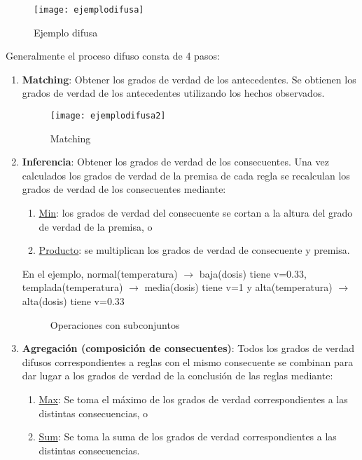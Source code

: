 \documentclass[12pt]{article}
\begin{document}
\begin{figure}[H]
\centering
\texttt{[image: ejemplodifusa]}
\caption{Ejemplo difusa}
\label{fig:ejemplodifusa}
\end{figure}

Generalmente el proceso difuso consta de 4 pasos:
\begin{enumerate}
\item \textbf{Matching}: Obtener los grados de verdad de los antecedentes. Se obtienen los grados de verdad de los antecedentes utilizando los hechos observados.
\begin{figure}[H]
\centering
\texttt{[image: ejemplodifusa2]}
\caption{Matching}
\label{fig:ejemplodifusa2}
\end{figure}
\item \textbf{Inferencia}: Obtener los grados de verdad de los consecuentes. Una vez calculados los grados de verdad de la premisa de cada regla se recalculan los grados de verdad de los consecuentes mediante:
\begin{enumerate}
\item \underline{Min}: los grados de verdad del consecuente se cortan a la altura del grado de verdad de la premisa, o
\item \underline{Producto}: se multiplican los grados de verdad de consecuente y premisa.
\end{enumerate}
En el ejemplo, normal(temperatura) $\rightarrow$ baja(dosis) tiene v=0.33, templada(temperatura) $\rightarrow$ media(dosis) tiene v=1 y alta(temperatura) $\rightarrow$ alta(dosis) tiene v=0.33
\begin{figure}[H]
 \centering
 \caption{Operaciones con subconjuntos}
 \label{f:ejemplodifusa3}
\end{figure}

\item \textbf{Agregación (composición de consecuentes)}: Todos los grados de verdad difusos correspondientes a reglas con el mismo consecuente se combinan para dar lugar a los grados de verdad de la conclusión de las reglas mediante:
\begin{enumerate}
\item \underline{Max}: Se toma el máximo de los grados de verdad correspondientes a las distintas consecuencias, o
\item \underline{Sum}: Se toma la suma de los grados de verdad correspondientes a las distintas consecuencias.
\end{enumerate}


\end{enumerate}
\end{document}
